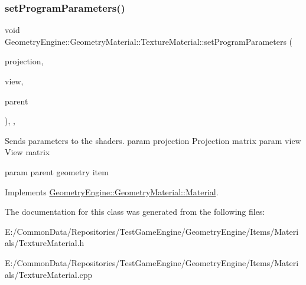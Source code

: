 \subsubsection{\texorpdfstring{setProgramParameters()}{setProgramParameters()}}
{\footnotesize\ttfamily void Geometry\+Engine\+::\+Geometry\+Material\+::\+Texture\+Material\+::set\+Program\+Parameters (\begin{DoxyParamCaption}\item[{const Q\+Matrix4x4 \&}]{projection,  }\item[{const Q\+Matrix4x4 \&}]{view,  }\item[{const \mbox{\hyperlink{class_geometry_engine_1_1_geometry_world_item_1_1_geometry_item_1_1_geometry_item}{Geometry\+World\+Item\+::\+Geometry\+Item\+::\+Geometry\+Item}} \&}]{parent }\end{DoxyParamCaption})\hspace{0.3cm}{\ttfamily [override]}, {\ttfamily [protected]}, {\ttfamily [virtual]}}

Sends parameters to the shaders. param projection Projection matrix param view View matrix

param parent geometry item 

Implements \mbox{\hyperlink{class_geometry_engine_1_1_geometry_material_1_1_material_a68310797df53062f237d0005fbcfce7e}{Geometry\+Engine\+::\+Geometry\+Material\+::\+Material}}.



The documentation for this class was generated from the following files\+:\begin{DoxyCompactItemize}
\item 
E\+:/\+Common\+Data/\+Repositories/\+Test\+Game\+Engine/\+Geometry\+Engine/\+Items/\+Materials/Texture\+Material.\+h\item 
E\+:/\+Common\+Data/\+Repositories/\+Test\+Game\+Engine/\+Geometry\+Engine/\+Items/\+Materials/Texture\+Material.\+cpp\end{DoxyCompactItemize}
